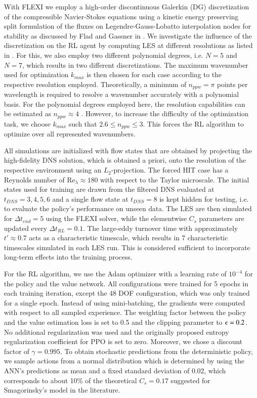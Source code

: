 With FLEXI we employ a high-order discontinuous Galerkin (DG) discretization of the compressible Navier-Stokes equations using a kinetic energy preserving split formulation of the fluxes on Legendre-Gauss-Lobatto interpolation nodes for stability as discussed by Flad and Gassner in \cite{flad2017use}.
We investigate the influence of the discretization on the RL agent by computing LES at different resolutions as listed in .
For this, we also employ two different polynomial degrees, i.e. $N=5$ and $N=7$, which results in two different discretizations. 
The maximum wavenumber used for optimization $k_{max}$ is then chosen for each case according to the respective resolution employed.
Theoretically, a minimum of $n_{ppw}=\pi$ points per wavelength is required to resolve a wavenumber accurately with a polynomial basis.
For the polynomial degrees employed here, the resolution capabilities can be estimated as $n_{ppw}\approx 4$ \cite{gassner2011comparison}.
However, to increase the difficulty of the optimization task, we choose $k_{max}$ such that $2.6 \le n_{ppw} \le 3$.
This forces the RL algorithm to optimize over all represented wavenumbers.
 
All simulations are initialized with flow states that are obtained by projecting the high-fidelity DNS solution, which is obtained a priori, onto the resolution of the respective environment using an $L_2$-projection.
The forced HIT case has a Reynolds number of $\mathrm{Re}_{\lambda}\approx 180$ with respect to the Taylor microscale.
The initial states used for training are drawn from the filtered DNS evaluated at $t_{DNS}=3,4,5,6$ and a single flow state at $t_{DNS}=8$ is kept hidden for testing, i.e. to evaluate the policy's performance on unseen data.
The LES are then simulated for $\Delta t_{end}=5$ using the FLEXI solver, while the elementwise $C_s$ parameters are updated every $\Delta t_{RL}=0.1$.
The large-eddy turnover time with approximately $t'\approx 0.7$ acts as a characteristic timescale, which results in 7 characteristic timescales simulated in each LES run.
This is considered sufficient to incorporate long-term effects into the training process.

For the RL algorithm, we use the Adam optimizer \cite{kingma2014adam} with a learning rate of $10^{-4}$ for the policy and the value network.
All configurations were trained for 5 epochs in each training iteration, except the 48 DOF configuration, which was only trained for a single epoch.
Instead of using mini-batching, the gradients were computed with respect to all sampled experience.
The weighting factor between the policy and the value estimation loss is set to 0.5 and the clipping parameter to $\epsilon=0.2$.
No additional regularization was used and the originally proposed entropy regularization coefficient for PPO is set to zero.
Moreover, we chose a discount factor of $\gamma=0.995$.
To obtain stochastic predictions from the deterministic policy, we sample actions from a normal distribution which is determined by using the ANN's predictions as mean and a fixed standard deviation of 0.02, which corresponds to about 10\% of the theoretical $C_s=0.17$ suggested for Smagorinsky's model in the literature.

